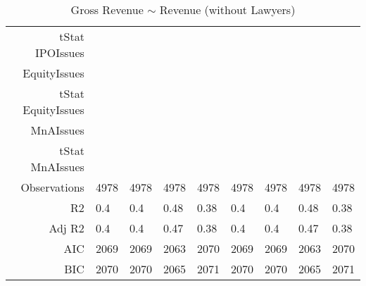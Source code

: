 \begin{table}[ht]
\begin{tabular}{rllllllll}
  tStat IPOIssues &  &  &  &  &  &  &  &  \\ 
  EquityIssues &  &  &  &  &  &  &  &  \\ 
  tStat EquityIssues &  &  &  &  &  &  &  &  \\ 
  MnAIssues &  &  &  &  &  &  &  &  \\ 
  tStat MnAIssues &  &  &  &  &  &  &  &  \\ 
  Observations & 4978 & 4978 & 4978 & 4978 & 4978 & 4978 & 4978 & 4978 \\ 
  R2 & 0.4 & 0.4 & 0.48 & 0.38 & 0.4 & 0.4 & 0.48 & 0.38 \\ 
  Adj R2 & 0.4 & 0.4 & 0.47 & 0.38 & 0.4 & 0.4 & 0.47 & 0.38 \\ 
  AIC & 2069 & 2069 & 2063 & 2070 & 2069 & 2069 & 2063 & 2070 \\ 
  BIC & 2070 & 2070 & 2065 & 2071 & 2070 & 2070 & 2065 & 2071 \\ 
   \hline
\end{tabular}
\caption{Gross Revenue $\sim$ Revenue (without Lawyers)} 
\end{table}
